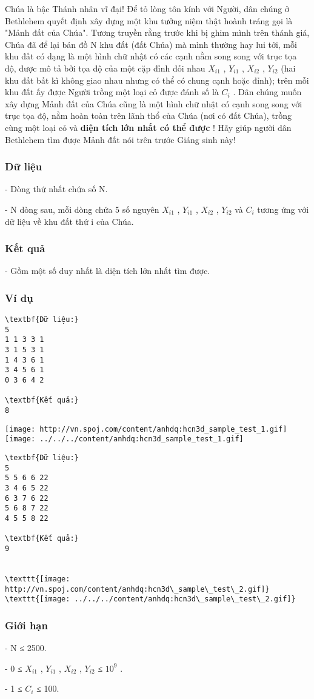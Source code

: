 

Chúa là bậc Thánh nhân vĩ đại! Để tỏ lòng tôn kính với Người, dân chúng ở Bethlehem quyết định xây dựng một khu tưởng niệm thật hoành tráng gọi là "Mảnh đất của Chúa". Tương truyền rằng trước khi bị ghim mình trên thánh giá, Chúa đã để lại bản đồ N khu đất (đất Chúa) mà mình thường hay lui tới, mỗi khu đất có dạng là một hình chữ nhật có các cạnh nằm song song với trục tọa độ, được mô tả bởi tọa độ của một cặp đỉnh đối nhau $X_{i1}$ , $Y_{i1}$ , $X_{i2}$ , $Y_{i2}$ (hai khu đất bất kì không giao nhau nhưng có thể có chung cạnh hoặc đỉnh); trên mỗi khu đất ấy được Người trồng một loại cỏ được đánh số là $C_{i}$ . Dân chúng muốn xây dựng Mảnh đất của Chúa cũng là một hình chữ nhật có cạnh song song với trục tọa độ, nằm hoàn toàn trên lãnh thổ của Chúa (nơi có đất Chúa), trồng cùng một loại cỏ và \textbf{ diện tích lớn nhất có thể được } ! Hãy giúp người dân Bethlehem tìm được Mảnh đất nói trên trước Giáng sinh này!

\subsubsection{Dữ liệu}

- Dòng thứ nhất chứa số N.


- N dòng sau, mỗi dòng chứa 5 số nguyên $X_{i1}$ , $Y_{i1}$ , $X_{i2}$ , $Y_{i2}$ và $C_{i}$ tương ứng với dữ liệu về khu đất thứ i của Chúa.

\subsubsection{Kết quả}

- Gồm một số duy nhất là diện tích lớn nhất tìm được.

\subsubsection{Ví dụ}
\begin{verbatim}
\textbf{Dữ liệu:}
5
1 1 3 3 1
3 1 5 3 1
1 4 3 6 1
3 4 5 6 1
0 3 6 4 2

\textbf{Kết quả:}
8
\end{verbatim}


\texttt{[image: http://vn.spoj.com/content/anhdq:hcn3d\_sample\_test\_1.gif]}
\texttt{[image: ../../../content/anhdq:hcn3d\_sample\_test\_1.gif]}
\begin{verbatim}
\textbf{Dữ liệu:}
5
5 5 6 6 22
3 4 6 5 22
6 3 7 6 22
5 6 8 7 22
4 5 5 8 22

\textbf{Kết quả:}
9


\texttt{[image: http://vn.spoj.com/content/anhdq:hcn3d\_sample\_test\_2.gif]}
\texttt{[image: ../../../content/anhdq:hcn3d\_sample\_test\_2.gif]}\end{verbatim}

\subsubsection{Giới hạn}

- N ≤ 2500.


- 0 ≤ $X_{i1}$ , $Y_{i1}$ , $X_{i2}$ , $Y_{i2}$ ≤ $10^{9}$ .


- 1 ≤ $C_{i}$ ≤ 100.

 
